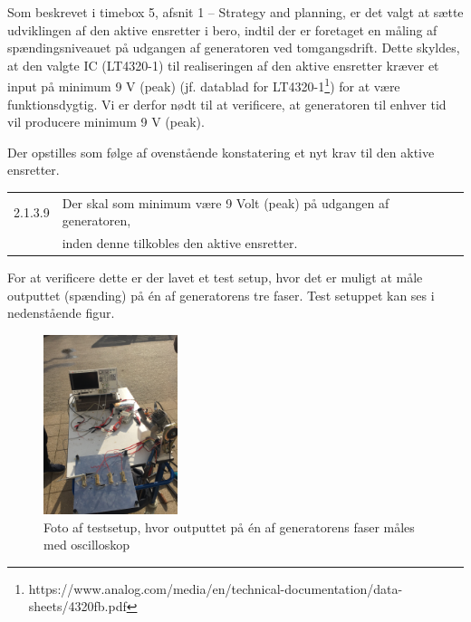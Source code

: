 Som beskrevet i timebox 5, afsnit 1 – Strategy and planning, er det valgt at sætte udviklingen af den aktive ensretter i bero, indtil der er foretaget en måling af spændingsniveauet på udgangen af generatoren ved tomgangsdrift. Dette skyldes, at den valgte IC (LT4320-1) til realiseringen af den aktive ensretter kræver et input på minimum 9 V (peak) (jf. datablad for LT4320-1\footnote{https://www.analog.com/media/en/technical-documentation/data-sheets/4320fb.pdf}) for at være funktionsdygtig. Vi er derfor nødt til at verificere, at generatoren til enhver tid vil producere minimum 9 V (peak). 

Der opstilles som følge af ovenstående konstatering et nyt krav til den aktive ensretter.\vspace{5mm}\\
\begin{tabular}[h]{ll}
  2.1.3.9&Der skal som minimum være 9 Volt (peak) på udgangen af generatoren,\\
           &inden denne tilkobles den aktive ensretter.\\
\end{tabular}
\vspace{2em}
\newline
For at verificere dette er der lavet et test setup, hvor det er muligt at måle outputtet (spænding) på én af generatorens tre faser. Test setuppet kan ses i nedenstående figur.

\begin{figure}[h]
  \centering
  \includegraphics[angle=-90,width=0.35\textwidth]{testsetup.JPG}
  \caption{Foto af testsetup, hvor outputtet på én af generatorens faser måles med oscilloskop}
  \label{fig:testsetup}
\end{figure}


